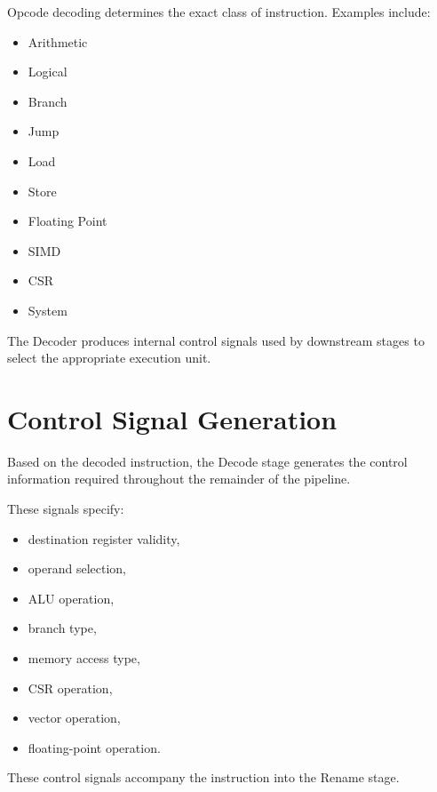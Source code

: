 Opcode decoding determines the exact class of instruction.
Examples include:
\begin{itemize}
  \item Arithmetic
  \item Logical
  \item Branch
  \item Jump
  \item Load
  \item Store
  \item Floating Point
  \item SIMD
  \item CSR
  \item System
\end{itemize}

The Decoder produces internal control signals used by downstream stages to select the
appropriate execution unit.

\begin{rtlrefs}
\end{rtlrefs}

\section{Control Signal Generation}

Based on the decoded instruction, the Decode stage generates the control information required
throughout the remainder of the pipeline.

These signals specify:
\begin{itemize}
  \item destination register validity,
  \item operand selection,
  \item ALU operation,
  \item branch type,
  \item memory access type,
  \item CSR operation,
  \item vector operation,
  \item floating-point operation.
\end{itemize}

These control signals accompany the instruction into the Rename stage.

\begin{rtlrefs}
\end{rtlrefs}

